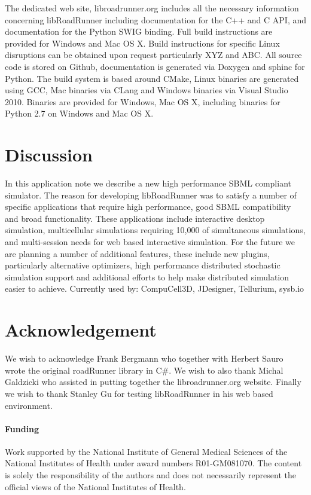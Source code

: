 \documentclass{bioinfo}
\begin{document}
\begin{methods}
The dedicated web site, libroadrunner.org includes all the necessary information concerning libRoadRunner including documentation for the C++ and C API, and documentation for the Python SWIG binding. Full build instructions are provided for Windows and Mac OS X. Build instructions for specific Linux disruptions can be obtained upon request particularly XYZ and ABC. All source code is stored on Github, documentation is generated via Doxygen and sphinc for Python. The build system is based around CMake, Linux binaries are generated using GCC, Mac binaries via CLang \citealp{Boffelli03} and Windows binaries via Visual Studio 2010. Binaries are provided for Windows, Mac OS X, including binaries for Python 2.7 on Windows and Mac OS X.

\end{methods}

\section{Discussion}

In this application note we describe a new high performance SBML compliant simulator. The reason for developing libRoadRunner was to satisfy a number of specific applications that require high performance, good SBML compatibility and broad functionality. These applications include interactive desktop simulation, multicellular simulations requiring 10,000 of simultaneous simulations, and multi-session needs for web based interactive simulation.  For the future we are planning a number of additional features, these include new plugins, particularly alternative optimizers, high performance distributed stochastic simulation support and additional efforts to help make distributed simulation easier to achieve. Currently used by: CompuCell3D, JDesigner, Tellurium, sysb.io

\section*{Acknowledgement}
We wish to acknowledge Frank Bergmann who together with Herbert Sauro wrote the original roadRunner library in C\#. We wish to also thank Michal Galdzicki who assisted in putting together the libroadrunner.org website. Finally we wish to thank Stanley Gu for testing libRoadRunner in his web based environment.

\paragraph{Funding\textcolon} Work supported by the National Institute of General Medical Sciences of the National Institutes of Health under award numbers R01-GM081070. The content is solely the responsibility of the authors and does not necessarily represent the official views of the National Institutes of Health.
\end{document}
